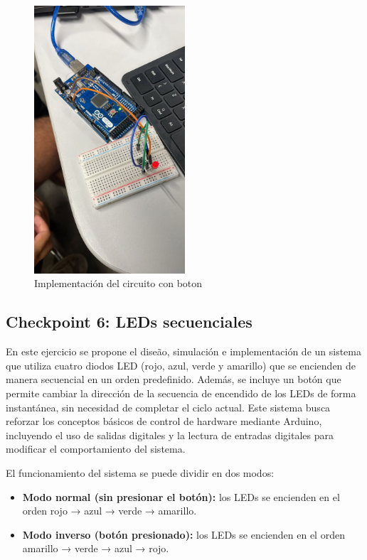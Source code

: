 \documentclass{article}
\begin{document}
\begin{figure}[H]
    \centering
    \includegraphics[width=0.50\textwidth]{./img/chkp-3-5-1.jpeg}
    \caption{Implementación del circuito con boton}
    \label{fig:simulacion_esquema8}
\end{figure}

\subsection{Checkpoint 6: LEDs secuenciales}

En este ejercicio se propone el dise\~ao, simulación e implementación de un sistema que utiliza cuatro diodos LED (rojo, azul, verde y amarillo) que se encienden de manera secuencial en un orden predefinido. Adem\'as, se incluye un botón que permite cambiar la dirección de la secuencia de encendido de los LEDs de forma instant\'anea, sin necesidad de completar el ciclo actual. Este sistema busca reforzar los conceptos b\'asicos de control de hardware mediante Arduino, incluyendo el uso de salidas digitales y la lectura de entradas digitales para modificar el comportamiento del sistema.

El funcionamiento del sistema se puede dividir en dos modos: 
\begin{itemize}
    \item \textbf{Modo normal (sin presionar el botón):} los LEDs se encienden en el orden rojo → azul → verde → amarillo.
    \item \textbf{Modo inverso (botón presionado):} los LEDs se encienden en el orden amarillo → verde → azul → rojo.
\end{itemize}
\end{document}
